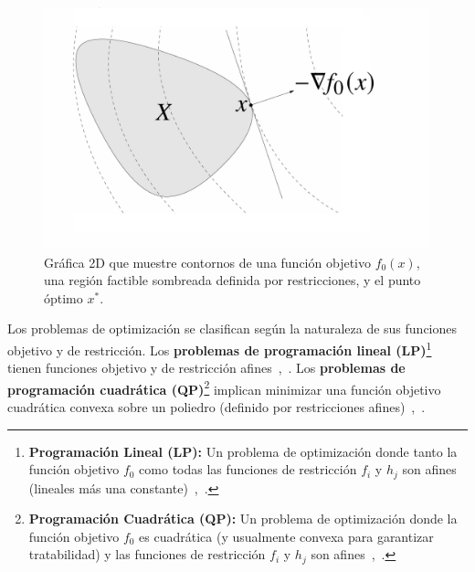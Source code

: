 \begin{figure}
    \centering
    \includegraphics[width=\linewidth]{img//marcoTeorico/optimizacion_fig1.png}
    \caption{Gráfica 2D que muestre contornos de una función objetivo $f_0(x)$,
              una región factible sombreada definida por restricciones, y el punto óptimo $x^*$.}%
    \label{fig:enter-label}
\end{figure}

Los problemas de optimización se clasifican según la naturaleza de sus funciones objetivo y de restricción.
Los \textbf{problemas de programación lineal (LP)}\footnote{\textbf{Programación Lineal (LP):} Un problema de
optimización donde tanto la función objetivo $f_0$ como todas las funciones de restricción $f_i$ y $h_j$ son afines
(lineales más una constante)~\cite[p.~4]{BoydVandenberghe2004},~\cite[p.~101]{BoydVandenbergheSlides2023}.} tienen
funciones objetivo y de restricción afines~\cite[p.~4]{BoydVandenberghe2004},~\cite[p.~101]{BoydVandenbergheSlides2023}.
Los \textbf{problemas de programación cuadrática (QP)}\footnote{\textbf{Programación Cuadrática (QP):} Un problema de
optimización donde la función objetivo $f_0$ es cuadrática (y usualmente convexa para garantizar tratabilidad) y las
funciones de restricción $f_i$ y $h_j$ son afines~\cite[p.~152]{BoydVandenberghe2004},~\cite[p.~105]{BoydVandenbergheSlides2023}.} implican minimizar una función objetivo cuadrática convexa sobre un
poliedro (definido por restricciones afines)~\cite[p.~152]{BoydVandenberghe2004},~\cite[p.~105]{BoydVandenbergheSlides2023}.


